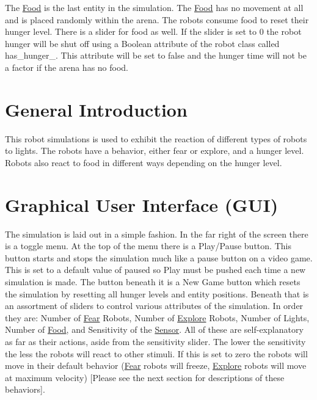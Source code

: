 The \mbox{\hyperlink{class_food}{Food}} is the last entity in the simulation. The \mbox{\hyperlink{class_food}{Food}} has no movement at all and is placed randomly within the arena. The robots consume food to reset their hunger level. There is a slider for food as well. If the slider is set to 0 the robot hunger will be shut off using a Boolean attribute of the robot class called has\+\_\+hunger\+\_\+. This attribute will be set to false and the hunger time will not be a factor if the arena has no food.\hypertarget{index_general_sec}{}\section{General Introduction}\label{index_general_sec}
This robot simulations is used to exhibit the reaction of different types of robots to lights. The robots have a behavior, either fear or explore, and a hunger level. Robots also react to food in different ways depending on the hunger level.\hypertarget{index_gui_sec}{}\section{Graphical User Interface (\+G\+U\+I)}\label{index_gui_sec}
The simulation is laid out in a simple fashion. In the far right of the screen there is a toggle menu. At the top of the menu there is a Play/\+Pause button. This button starts and stops the simulation much like a pause button on a video game. This is set to a default value of paused so Play must be pushed each time a new simulation is made. The button beneath it is a New Game button which resets the simulation by resetting all hunger levels and entity positions. Beneath that is an assortment of sliders to control various attributes of the simulation. In order they are\+: Number of \mbox{\hyperlink{class_fear}{Fear}} Robots, Number of \mbox{\hyperlink{class_explore}{Explore}} Robots, Number of Lights, Number of \mbox{\hyperlink{class_food}{Food}}, and Sensitivity of the \mbox{\hyperlink{class_sensor}{Sensor}}. All of these are self-\/explanatory as far as their actions, aside from the sensitivity slider. The lower the sensitivity the less the robots will react to other stimuli. If this is set to zero the robots will move in their default behavior (\mbox{\hyperlink{class_fear}{Fear}} robots will freeze, \mbox{\hyperlink{class_explore}{Explore}} robots will move at maximum velocity) \mbox{[}Please see the next section for descriptions of these behaviors\mbox{]}.


